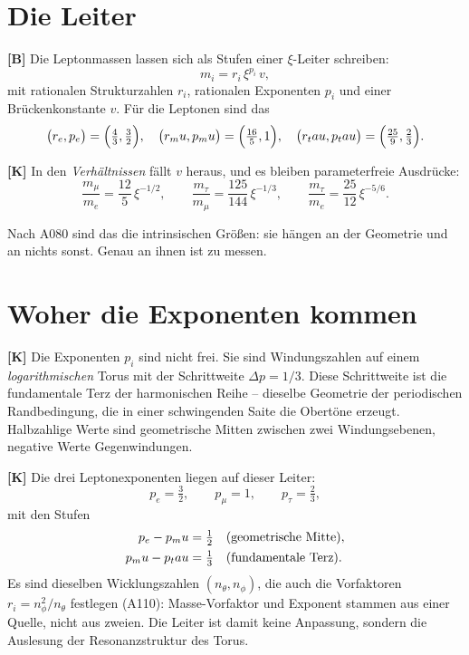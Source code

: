 \section{Die Leiter}

\textbf{[B]} Die Leptonmassen lassen sich als Stufen einer $\xi$-Leiter
schreiben:
\[
  m_i = r_i\,\xi^{p_i}\,v ,
\]
mit rationalen Strukturzahlen $r_i$, rationalen Exponenten $p_i$ und einer
Brückenkonstante $v$. Für die Leptonen sind das
\[
  \bigl(r_e,p_e\bigr) = \Bigl(\tfrac43,\tfrac32\Bigr),\quad
  \bigl(r_\mu,p_\mu\bigr) = \Bigl(\tfrac{16}{5},1\Bigr),\quad
  \bigl(r_\tau,p_\tau\bigr) = \Bigl(\tfrac{25}{9},\tfrac23\Bigr).
\]

\textbf{[K]} In den \emph{Verhältnissen} fällt $v$ heraus, und es bleiben
parameterfreie Ausdrücke:
\[
  \frac{m_\mu}{m_e} = \frac{12}{5}\,\xi^{-1/2},\qquad
  \frac{m_\tau}{m_\mu} = \frac{125}{144}\,\xi^{-1/3},\qquad
  \frac{m_\tau}{m_e} = \frac{25}{12}\,\xi^{-5/6}.
\]

Nach A080 sind das die intrinsischen Größen: sie hängen an der Geometrie und an
nichts sonst. Genau an ihnen ist zu messen.

\section{Woher die Exponenten kommen}

\textbf{[K]} Die Exponenten $p_i$ sind nicht frei. Sie sind Windungszahlen auf
einem \emph{logarithmischen} Torus mit der Schrittweite $\Delta p = 1/3$. Diese
Schrittweite ist die fundamentale Terz der harmonischen Reihe -- dieselbe
Geometrie der periodischen Randbedingung, die in einer schwingenden Saite die
Obertöne erzeugt. Halbzahlige Werte sind geometrische Mitten zwischen zwei
Windungsebenen, negative Werte Gegenwindungen.

\textbf{[K]} Die drei Leptonexponenten liegen auf dieser Leiter:
\[
  p_e = \tfrac32,\qquad p_\mu = 1,\qquad p_\tau = \tfrac23,
\]
mit den Stufen
\begin{align}
  p_e   - p_\mu  &= \tfrac12 &&(\text{geometrische Mitte}), \notag\\
  p_\mu - p_\tau &= \tfrac13 &&(\text{fundamentale Terz}). \notag
\end{align}
Es sind dieselben Wicklungszahlen $(n_\theta, n_\phi)$, die auch die Vorfaktoren
$r_i = n_\phi^2/n_\theta$ festlegen (A110): Masse-Vorfaktor und
Exponent stammen aus einer Quelle, nicht aus zweien. Die Leiter ist damit keine
Anpassung, sondern die Auslesung der Resonanzstruktur des Torus.

